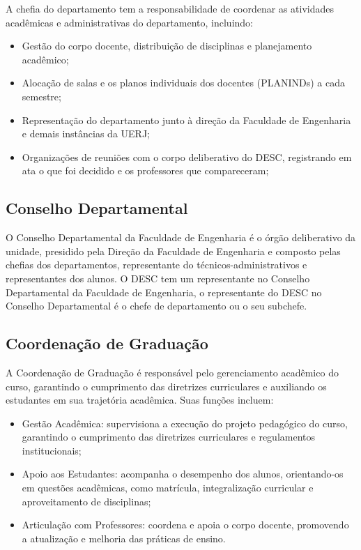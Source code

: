 A chefia do departamento tem a responsabilidade de coordenar as atividades acadêmicas e administrativas do departamento, incluindo:

\begin{itemize}
    \item Gestão do corpo docente, distribuição de disciplinas e planejamento acadêmico;
    \item Alocação de salas e os planos individuais dos docentes (PLANINDs) a cada semestre;
    \item Representação do departamento junto à direção da Faculdade de Engenharia e demais instâncias da UERJ;
    \item Organizações de reuniões com o corpo deliberativo do DESC, registrando em ata o que foi decidido e os professores que compareceram;
\end{itemize}

\subsection{Conselho Departamental}

O Conselho Departamental da Faculdade de Engenharia é o órgão deliberativo da unidade, presidido pela Direção da Faculdade de Engenharia e composto pelas chefias dos departamentos, representante do técnicos-administrativos e representantes dos alunos. O DESC tem um representante no Conselho Departamental da Faculdade de Engenharia, o representante do DESC no Conselho Departamental é o chefe de departamento ou o seu subchefe.


\subsection{Coordenação de Graduação}

A Coordenação de Graduação é responsável pelo gerenciamento acadêmico do curso, garantindo o cumprimento das diretrizes curriculares e auxiliando os estudantes em sua trajetória acadêmica. Suas funções incluem:

\begin{itemize}
    \item Gestão Acadêmica: supervisiona a execução do projeto pedagógico do curso, garantindo o cumprimento das diretrizes curriculares e regulamentos institucionais;
    \item Apoio aos Estudantes: acompanha o desempenho dos alunos, orientando-os em questões acadêmicas, como matrícula, integralização curricular e aproveitamento de disciplinas;
    \item Articulação com Professores: coordena e apoia o corpo docente, promovendo a atualização e melhoria das práticas de ensino.

\end{itemize}

